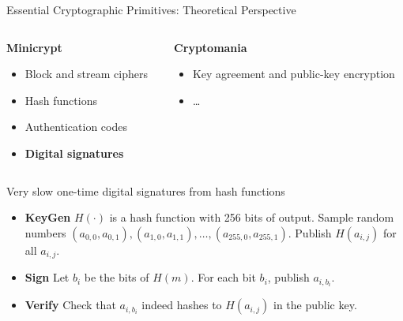 \documentclass[xcolor=table,10pt,aspectratio=169]{beamer}
\begin{document}
\begin{frame}[label={sec:org9c7855e}]{Essential Cryptographic Primitives: Theoretical Perspective}
\begin{columns}[t]
\begin{column}{0.5\columnwidth}
\textbf{Minicrypt}

\small

\begin{itemize}
\item Block and stream ciphers
\item Hash functions
\item Authentication codes
\item \textbf{Digital signatures}
\end{itemize}
\end{column}

\begin{column}{0.5\columnwidth}
\textbf{Cryptomania}

\small

\begin{itemize}
\item Key agreement and public-key encryption
\item \ldots
\end{itemize}


\pause
\end{column}
\end{columns}

\begin{block}{Very slow one-time digital signatures from hash functions}
\begin{itemize}
\item \textbf{KeyGen} \(H(\cdot)\) is a hash function with 256 bits of output. Sample random numbers \((a_{0,0}, a_{0,1}), (a_{1,0}, a_{1,1}), \ldots, (a_{255,0}, a_{255,1})\). Publish \(H(a_{i,j})\) for all \(a_{i,j}\).\\[0pt]
\item \textbf{Sign}   Let \(b_i\) be the bits of \(H(m)\). For each bit \(b_i\), publish \(a_{i, b_i}\).\\[0pt]
\item \textbf{Verify} Check that \(a_{i, b_i}\) indeed hashes to \(H(a_{i,j})\) in the public key.
\end{itemize}
\end{block}
\end{frame}
\end{document}
